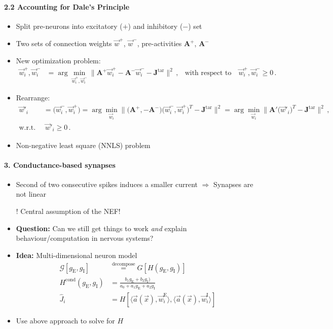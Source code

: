 \documentclass[10pt,letterpaper]{article}
\newcommand{\mat}[1]{\mathbf{#1}}
\begin{document}
\paragraph{2.2 Accounting for Dale's Principle}
\begin{itemize}
	\item Split pre-neurons into excitatory ($+$) and inhibitory ($-$) set
	\item Two sets of connection weights $\vec w^+$, $\vec w^-$, pre-activities $\mat A^+$, $\mat A^-$
	\item New optimization problem:
	\begin{align*}
		\vec w_i^+, \vec w_i^- &= \arg\min_{\vec w_i^+, \vec w_i^-} \big\| \mat A^+ \vec w^+_i - \mat A^- \vec w^-_i - \mat J^\mathrm{tar} \big\|^2 \,, & \text{with respect to} \quad \vec w_i^+, \vec w_i^- \geq 0 \,.
	\end{align*}
	\item Rearrange:
	\begin{align*}
		\vec w'_i &= \big(\vec w^-_i, \vec w^+_i\big) 
		= \arg\min_{\vec w_i} \big\| \big( \mat A^+, - \mat A^- \big) \big(\vec w^-_i, \vec w^+_i \big)^T - \mat J^\mathrm{tar} \big\|^2
		= \arg\min_{\vec w_i} \big\| \mat A' \big(\vec w'_i\big)^T - \mat J^\mathrm{tar} \big\|^2 \,, \\
		\text{w.r.t. } &~ \vec w'_i \geq 0 \,.
	\end{align*}
	\item Non-negative least square (NNLS) problem
\end{itemize}

\paragraph{3. Conductance-based synapses}
\begin{itemize}
	\item Second of two consecutive spikes induces a smaller current $\Rightarrow$ Synapses are not linear
	\item[!] Central assumption of the NEF!
	\item \textbf{Question:} Can we still get things to work \emph{and} explain behaviour/computation in nervous systems?
	\item \textbf{Idea:} Multi-dimensional neuron model
	\begin{align*}
		\mathcal{G}[g_\mathrm{E}, g_\mathrm{I}] &\overset{\text{decompose}}= G[H(g_\mathrm{E}, g_\mathrm{I})] \\
		H^\mathrm{cond}(g_\mathrm{E}, g_\mathrm{I}) &= \frac{b_1 g_\mathrm{E} + b_2 g_\mathrm{I})}{a_0 + a_1 g_\mathrm{E} + a_2 g_\mathrm{I}} \\
		\hat J_i &= H[\langle \vec a(\vec x), \vec w^\mathrm{E}_i \rangle, \langle \vec a(\vec x), \vec w^\mathrm{I}_i \rangle]
	\end{align*}
	\item Use above approach to solve for $H$
\end{itemize}
\end{document}

